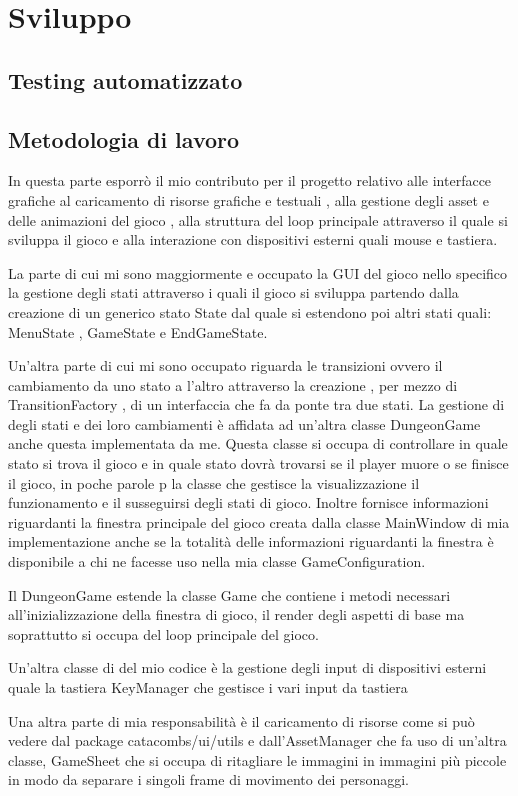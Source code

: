 \documentclass[a4paper,12pt]{report}
\begin{document}
    \chapter{Sviluppo}
    \section{Testing automatizzato}
    \section{Metodologia di lavoro}
    \par In questa parte esporrò il mio contributo per il progetto relativo alle interfacce grafiche al caricamento di risorse grafiche
    e testuali , alla gestione degli asset e delle animazioni del gioco , alla struttura del loop principale attraverso il quale si
    sviluppa il gioco e alla interazione con dispositivi esterni quali mouse e tastiera.
    \par La parte di cui mi sono maggiormente e occupato la GUI del gioco nello specifico la gestione degli stati attraverso i quali
    il gioco si sviluppa partendo dalla creazione di un generico stato State dal quale si estendono poi altri stati quali:
    MenuState , GameState e EndGameState.
    \par Un’altra parte di cui mi sono occupato riguarda le transizioni ovvero il cambiamento da uno stato a l’altro attraverso la creazione
    , per mezzo di  TransitionFactory , di un interfaccia che fa da ponte tra due stati. La gestione di degli stati e dei loro
    cambiamenti è affidata ad un'altra classe DungeonGame anche questa implementata da me. Questa classe si occupa di controllare
    in quale stato si trova il gioco e in quale stato dovrà trovarsi se il player muore o se finisce il gioco, in poche parole p la
    classe che gestisce la visualizzazione il funzionamento e il susseguirsi degli stati di gioco. Inoltre fornisce informazioni
    riguardanti la finestra principale del gioco creata dalla classe MainWindow di mia implementazione anche se la totalità delle
    informazioni riguardanti la finestra è disponibile a chi  ne facesse uso nella mia classe GameConfiguration.
    \par Il DungeonGame estende la classe Game che contiene i metodi necessari all’inizializzazione della finestra di gioco,
    il render degli aspetti di base ma soprattutto si occupa del loop principale del gioco.
    \par Un’altra classe di del mio codice è la gestione degli input di dispositivi esterni quale la tastiera KeyManager che
    gestisce i vari input da tastiera
    \par Una altra parte di mia responsabilità è il caricamento di risorse come si può vedere dal package catacombs/ui/utils
    e dall’AssetManager che fa uso di un’altra classe, GameSheet che si occupa di ritagliare le immagini in immagini più piccole
    in modo da separare i singoli frame di movimento dei personaggi.
\end{document}
